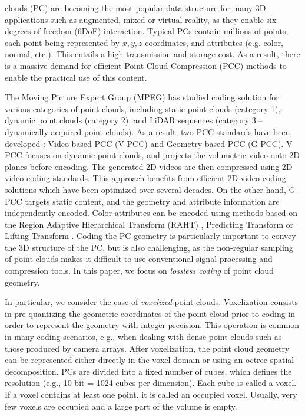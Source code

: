 

 clouds (PC) are becoming the most popular data structure for many 3D applications such as augmented, mixed or virtual reality, as they enable six degrees of freedom (6DoF) interaction. 
Typical PCs contain millions of points, each point being represented by $x,y,z$ coordinates, and attributes (e.g. color, normal, etc.). This entails a high transmission and storage cost. As a result, there is a massive demand for efficient Point Cloud Compression (PCC) methods to enable the practical use of this content. 
%
\par %
The Moving Picture Expert Group (MPEG) has studied coding solution for various categories of point clouds, including static point clouds (category 1), dynamic point clouds (category 2), and LiDAR sequences (category 3 -- dynamically acquired point clouds). As a result, two PCC standards have been developed \cite{8571288,jang2019video,graziosi2020overview}: Video-based PCC (V-PCC) and Geometry-based PCC (G-PCC). V-PCC focuses on dynamic point clouds, and projects the volumetric video onto 2D planes before encoding. The generated 2D videos are then compressed using 2D video coding standards. This approach benefits from efficient 2D video coding solutions which have been optimized over several decades.  On the other hand, G-PCC targets static content, and the geometry and attribute information are independently encoded. Color attributes can be encoded using methods based on the Region Adaptive Hierarchical Transform (RAHT) \cite{de2016compression}, Predicting Transform or Lifting Transform \cite{graziosi2020overview}. 
Coding the PC geometry is particularly important to convey the 3D structure of the PC, but is also challenging, as the non-regular sampling of point clouds makes it difficult to use conventional signal processing and compression tools.
In this paper, we focus on \textit{lossless coding} of point cloud geometry. 
\par In particular, we consider the case of \textit{voxelized} point clouds. Voxelization consists in pre-quantizing the geometric coordinates of the point cloud prior to coding in order to represent the geometry with integer precision. This operation is common in many coding scenarios, e.g., when dealing with dense point clouds such as those produced by camera arrays.
After voxelization, the point cloud geometry can be represented either directly in the voxel domain or using an octree spatial decomposition. PCs are divided into a fixed number of cubes, which defines the resolution (e.g., 10 bit = 1024 cubes per dimension).  Each cube is called a voxel. If a voxel contains at least one point, it is called an occupied voxel. Usually, very few voxels are occupied and a large part of the volume is empty. 
